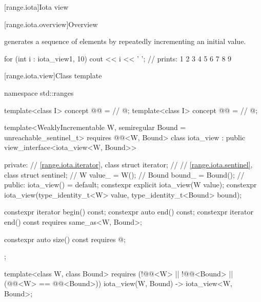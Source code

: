 [range.iota]{Iota view}

[range.iota.overview]{Overview}

\pnum
{} generates a
sequence of elements by repeatedly incrementing an initial value.

\pnum
\begin{example}
\begin{codeblock}
for (int i : iota_view{1, 10})
  cout << i << ' '; // prints: 1 2 3 4 5 6 7 8 9
\end{codeblock}
\end{example}

[range.iota.view]{Class template }

\begin{codeblock}
namespace std::ranges {
  template<class I>
    concept @@ =     // \expos
      @\seebelow@;
  template<class I>
    concept @@ =       // \expos
      @\seebelow@;

  template<WeaklyIncrementable W, semiregular Bound = unreachable_sentinel_t>
    requires @@<W, Bound>
  class iota_view : public view_interface<iota_view<W, Bound>> {
  private:
    // \ref{range.iota.iterator}, class 
    struct iterator;            // \expos
    // \ref{range.iota.sentinel}, class 
    struct sentinel;            // \expos
    W value_ = W();             // \expos
    Bound bound_ = Bound();     // \expos
  public:
    iota_view() = default;
    constexpr explicit iota_view(W value);
    constexpr iota_view(type_identity_t<W> value,
                        type_identity_t<Bound> bound);

    constexpr iterator begin() const;
    constexpr auto end() const;
    constexpr iterator end() const requires same_as<W, Bound>;

    constexpr auto size() const requires @\seebelow@;
  };

  template<class W, class Bound>
    requires (!@@<W> || !@@<Bound> ||
      (@@<W> == @@<Bound>))
    iota_view(W, Bound) -> iota_view<W, Bound>;
}
\end{codeblock}

